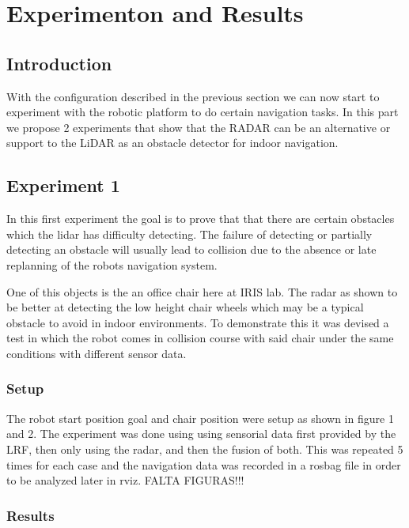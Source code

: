 \chapter{Experimenton and Results}

\section{Introduction}
With the configuration described in the previous section we can now start to experiment with the robotic platform to do certain navigation tasks. In this part we propose 2 experiments that show that the \ac{RADAR} can be an alternative or support to the \ac{LiDAR} as an obstacle detector for indoor navigation.

\section {Experiment 1}
In this first experiment the goal is to prove that that there are certain obstacles which the lidar has difficulty detecting. The failure of detecting or partially detecting an obstacle will usually lead to collision due to the absence or late replanning of the robots navigation system.

One of this objects is the an office chair here at IRIS lab. The radar as shown to  be better at detecting the low height chair wheels which may be a typical obstacle to avoid in indoor environments. To demonstrate this it was devised a test in which the robot comes in collision course with said chair under the same conditions with different sensor data. 
\subsection{Setup}
The robot start position goal and chair position were setup as shown in figure 1 and 2. The experiment was done using using sensorial data first provided by the \ac{LRF}, then only using the radar, and then the fusion of both. This was repeated 5 times for each case and the navigation data was recorded in a rosbag file in order to be analyzed later in rviz.
FALTA FIGURAS!!!
\subsection{Results}
